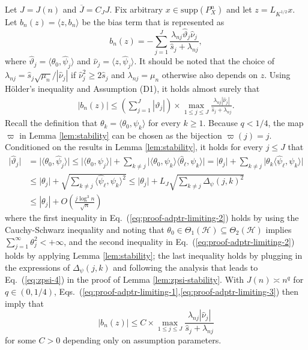\documentclass[11pt,a4paper]{article}
\renewcommand{\hat}{\widehat}
\renewcommand{\bar}{\overline}
\theoremstyle{definition}
\theoremstyle{plain}
\theoremstyle{remark}
\newcommand{\supp}{\mathrm{supp}}
\newcommand{\mH}{\mathcal H}
\begin{document}
Let $J=J(n)$ and $\bar J=C_JJ$.
Fix arbitrary $x\in\supp(P_X^n)$ and let $z=L_{K^{1/2}}x$. Let $b_n(z)=\langle z, b_n\rangle$ be the bias term that is represented as
$$
b_n(z) = -\sum_{j=1}^J\frac{\lambda_{nj}\hat\vartheta_j\hat\nu_j}{\hat s_j+\lambda_{nj}},
$$
where $\hat\vartheta_j=\langle\theta_0,\hat\psi_j\rangle$ and $\hat\nu_j=\langle z, \hat\psi_j\rangle$. It should be noted that the choice of
$\lambda_{nj}=\hat s_j\sqrt{\mu_n}/|\hat\nu_j|$ if $\hat\nu_j^2\geq 2\hat s_j$ and $\lambda_{nj}=\mu_n$ otherwise also depends on $z$.
Using H\"{o}lder's inequality and Assumption (D1), it holds almost surely that
\begin{align}
\big|b_n(z)\big| \leq \left(\sum_{j=1}^{J}|\vartheta_j|\right)\times \max_{1\leq j\leq J}\frac{\lambda_{nj}|\hat\nu_j|}{\hat s_j+\lambda_{nj}}.
\label{eq:proof-adptr-limiting-1}
\end{align}
Recall the definition that $\theta_k=\langle\theta_0,\psi_k\rangle$ for every $k\geq 1$.
Because $q<1/4$, the map $\varpi$ in Lemma \ref{lem:stability} can be chosen as the bijection $\varpi(j)=j$.
Conditioned on the results in Lemma \ref{lem:stability}, it holds for every $j\leq J$ that
\begin{align}
\big|\hat\vartheta_j\big| &= \big|\langle \theta_0,\hat\psi_j\rangle\big| \leq \big|\langle \theta_0,\psi_j\rangle\big| + \sum_{k\neq j}\big|\langle\theta_0,\psi_k\rangle\langle\hat\theta_\ell,\psi_k\rangle\big|
=\big|\theta_j\big| + \sum_{k\neq j}\big|\theta_k\langle\hat\psi_\ell,\psi_k\rangle\big|\nonumber\\
&\leq \big|\theta_j\big| + \sqrt{\sum_{k\neq j}\langle\hat\psi_\ell,\psi_k\rangle^2} \leq \big|\theta_j\big| + L_J\sqrt{\sum_{k\neq j}\Delta_\psi(j,k)^2}\label{eq:proof-adptr-limiting-2}\\
&\leq |\theta_j| + O\left(\frac{j\log^3 n}{\sqrt{n}}\right)\label{eq:proof-adptr-limiting-3}
\end{align}
where the first inequality in Eq.~(\ref{eq:proof-adptr-limiting-2}) holds by using the Cauchy-Schwarz inequality and noting that $\theta_0\in\Theta_1(\mH)\subseteq\Theta_2(\mH)$ implies $\sum_{j=1}^{\infty}\theta_j^2<+\infty$,
and the second inequality in Eq.~(\ref{eq:proof-adptr-limiting-2}) holds by applying Lemma \ref{lem:stability}; the last inequality holds by plugging in the expressions of $\Delta_\psi(j,k)$
and following the analysis that leads to Eq.~(\ref{eq:zpsi-4}) in the proof of Lemma \ref{lem:zpsi-stability}.
With $J(n)\asymp n^q$ for $q\in(0,1/4)$, Eqs.~(\ref{eq:proof-adptr-limiting-1},\ref{eq:proof-adptr-limiting-3}) then imply that
\begin{equation}
\big|b_n(z)\big| \leq C\times  \max_{1\leq j\leq J}\frac{\lambda_{nj}|\hat\nu_j|}{\hat s_j+\lambda_{nj}}
\label{eq:proof-adptr-limiting-4}
\end{equation}
for some $C>0$ depending only on assumption parameters. 
\end{document}
